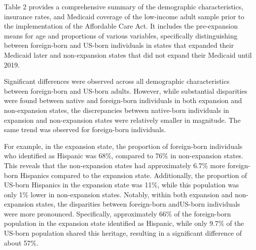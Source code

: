 \documentclass[
]{article}
\begin{document}
Table 2 provides a comprehensive summary of the demographic
characteristics, insurance rates, and Medicaid coverage of the
low-income adult sample prior to the implementation of the Affordable
Care Act. It includes the pre-expansion means for age and proportions of
various variables, specifically distinguishing between foreign-born and
US-born individuals in states that expanded their Medicaid later and
non-expansion states that did not expand their Medicaid until 2019.

Significant differences were observed across all demographic
characteristics between foreign-born and US-born adults. However, while
substantial disparities were found between native and foreign-born
individuals in both expansion and non-expansion states, the
discrepancies between native-born individuals in expansion and
non-expansion states were relatively smaller in magnitude. The same
trend was observed for foreign-born individuals.

For example, in the expansion state, the proportion of foreign-born
individuals who identified as Hispanic was 68\%, compared to 76\% in
non-expansion states. This reveals that the non-expansion states had
approximately 6.7\% more foreign-born Hispanics compared to the
expansion state. Additionally, the proportion of US-born Hispanics in
the expansion state was 11\%, while this population was only 1\% lower
in non-expansion states. Notably, within both expansion and
non-expansion states, the disparities between foreign-born andUS-born
individuals were more pronounced. Specifically, approximately 66\% of
the foreign-born population in the expansion state identified as
Hispanic, while only 9.7\% of the US-born population shared this
heritage, resulting in a significant difference of about 57\%.

\begingroup\fontsize{6}{8}\selectfont
\end{document}
